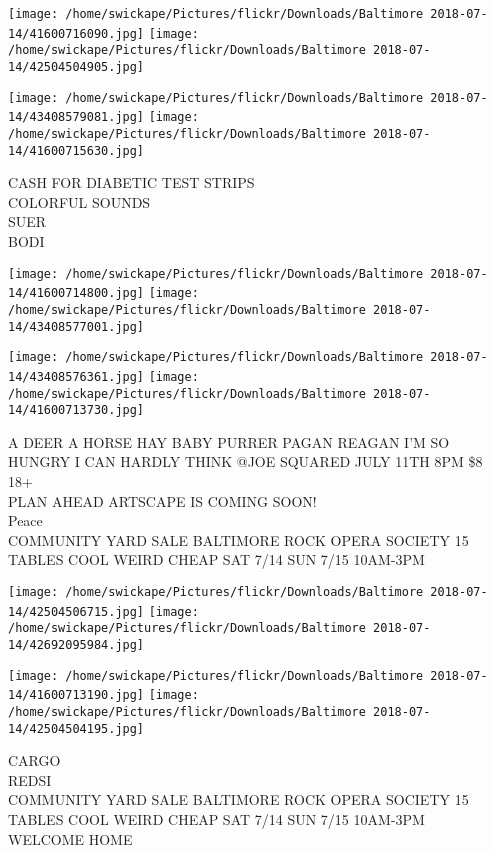 \documentclass[10pt,letterpaper]{article}
\begin{document}
\texttt{[image: /home/swickape/Pictures/flickr/Downloads/Baltimore 2018-07-14/41600716090.jpg]}
\texttt{[image: /home/swickape/Pictures/flickr/Downloads/Baltimore 2018-07-14/42504504905.jpg]}

\texttt{[image: /home/swickape/Pictures/flickr/Downloads/Baltimore 2018-07-14/43408579081.jpg]}
\texttt{[image: /home/swickape/Pictures/flickr/Downloads/Baltimore 2018-07-14/41600715630.jpg]}

CASH FOR DIABETIC TEST STRIPS\\
COLORFUL SOUNDS\\
SUER\\
BODI\\
\pagebreak

\texttt{[image: /home/swickape/Pictures/flickr/Downloads/Baltimore 2018-07-14/41600714800.jpg]}
\texttt{[image: /home/swickape/Pictures/flickr/Downloads/Baltimore 2018-07-14/43408577001.jpg]}

\texttt{[image: /home/swickape/Pictures/flickr/Downloads/Baltimore 2018-07-14/43408576361.jpg]}
\texttt{[image: /home/swickape/Pictures/flickr/Downloads/Baltimore 2018-07-14/41600713730.jpg]}

A DEER A HORSE HAY BABY PURRER PAGAN REAGAN I'M SO HUNGRY I CAN HARDLY THINK @JOE SQUARED JULY 11TH 8PM \$8 18+\\
PLAN AHEAD ARTSCAPE IS COMING SOON!\\
Peace\\
COMMUNITY YARD SALE BALTIMORE ROCK OPERA SOCIETY 15 TABLES COOL WEIRD CHEAP SAT 7/14 SUN 7/15 10AM{-}3PM\\
\pagebreak

\texttt{[image: /home/swickape/Pictures/flickr/Downloads/Baltimore 2018-07-14/42504506715.jpg]}
\texttt{[image: /home/swickape/Pictures/flickr/Downloads/Baltimore 2018-07-14/42692095984.jpg]}

\texttt{[image: /home/swickape/Pictures/flickr/Downloads/Baltimore 2018-07-14/41600713190.jpg]}
\texttt{[image: /home/swickape/Pictures/flickr/Downloads/Baltimore 2018-07-14/42504504195.jpg]}

CARGO\\
REDSI\\
COMMUNITY YARD SALE BALTIMORE ROCK OPERA SOCIETY 15 TABLES COOL WEIRD CHEAP SAT 7/14 SUN 7/15 10AM{-}3PM\\
WELCOME HOME\\
\pagebreak
\end{document}
